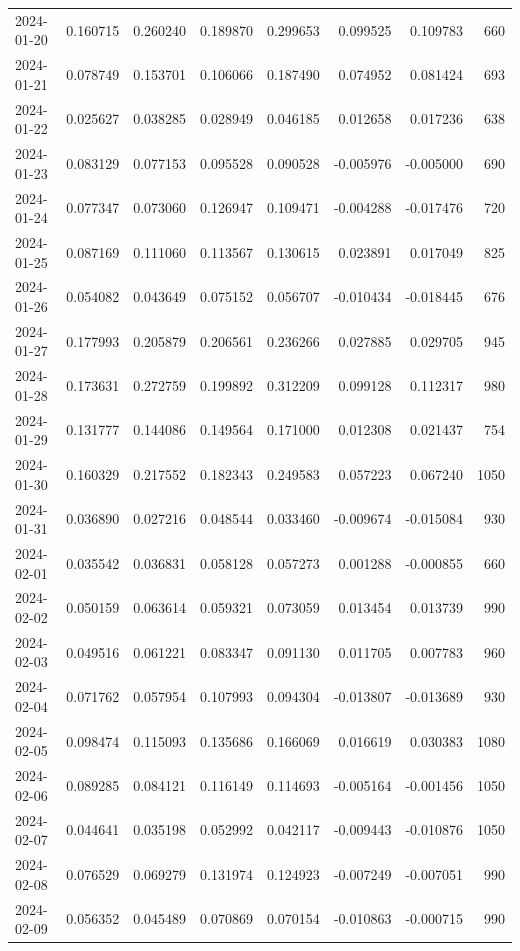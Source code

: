 \begin{tabular}{lrrrrrrr}
2024-01-20 & 0.160715 & 0.260240 & 0.189870 & 0.299653 & 0.099525 & 0.109783 & 660 \\
2024-01-21 & 0.078749 & 0.153701 & 0.106066 & 0.187490 & 0.074952 & 0.081424 & 693 \\
2024-01-22 & 0.025627 & 0.038285 & 0.028949 & 0.046185 & 0.012658 & 0.017236 & 638 \\
2024-01-23 & 0.083129 & 0.077153 & 0.095528 & 0.090528 & -0.005976 & -0.005000 & 690 \\
2024-01-24 & 0.077347 & 0.073060 & 0.126947 & 0.109471 & -0.004288 & -0.017476 & 720 \\
2024-01-25 & 0.087169 & 0.111060 & 0.113567 & 0.130615 & 0.023891 & 0.017049 & 825 \\
2024-01-26 & 0.054082 & 0.043649 & 0.075152 & 0.056707 & -0.010434 & -0.018445 & 676 \\
2024-01-27 & 0.177993 & 0.205879 & 0.206561 & 0.236266 & 0.027885 & 0.029705 & 945 \\
2024-01-28 & 0.173631 & 0.272759 & 0.199892 & 0.312209 & 0.099128 & 0.112317 & 980 \\
2024-01-29 & 0.131777 & 0.144086 & 0.149564 & 0.171000 & 0.012308 & 0.021437 & 754 \\
2024-01-30 & 0.160329 & 0.217552 & 0.182343 & 0.249583 & 0.057223 & 0.067240 & 1050 \\
2024-01-31 & 0.036890 & 0.027216 & 0.048544 & 0.033460 & -0.009674 & -0.015084 & 930 \\
2024-02-01 & 0.035542 & 0.036831 & 0.058128 & 0.057273 & 0.001288 & -0.000855 & 660 \\
2024-02-02 & 0.050159 & 0.063614 & 0.059321 & 0.073059 & 0.013454 & 0.013739 & 990 \\
2024-02-03 & 0.049516 & 0.061221 & 0.083347 & 0.091130 & 0.011705 & 0.007783 & 960 \\
2024-02-04 & 0.071762 & 0.057954 & 0.107993 & 0.094304 & -0.013807 & -0.013689 & 930 \\
2024-02-05 & 0.098474 & 0.115093 & 0.135686 & 0.166069 & 0.016619 & 0.030383 & 1080 \\
2024-02-06 & 0.089285 & 0.084121 & 0.116149 & 0.114693 & -0.005164 & -0.001456 & 1050 \\
2024-02-07 & 0.044641 & 0.035198 & 0.052992 & 0.042117 & -0.009443 & -0.010876 & 1050 \\
2024-02-08 & 0.076529 & 0.069279 & 0.131974 & 0.124923 & -0.007249 & -0.007051 & 990 \\
2024-02-09 & 0.056352 & 0.045489 & 0.070869 & 0.070154 & -0.010863 & -0.000715 & 990 \\

\end{tabular}

